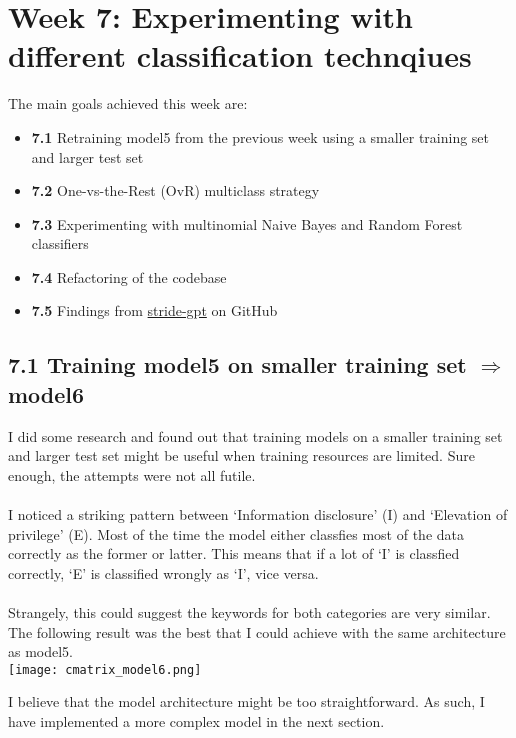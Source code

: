 \section*{Week 7: Experimenting with different classification technqiues}

The main goals achieved this week are:
\begin{itemize}[topsep=0pt]
    \item \textbf{7.1} Retraining model5 from the previous week using a smaller training set and larger test set
    \item \textbf{7.2} One-vs-the-Rest (OvR) multiclass strategy
    \item \textbf{7.3} Experimenting with multinomial Naive Bayes and Random Forest classifiers
    \item \textbf{7.4} Refactoring of the codebase
    \item \textbf{7.5} Findings from \href{https://github.com/mrwadams/stride-gpt?tab=readme-ov-file#usage}{stride-gpt} on GitHub
\end{itemize}

\subsection*{7.1 Training model5 on smaller training set $\Longrightarrow$ model6}
I did some research and found out that training models on a smaller training set and larger test set might be useful when training resources are limited.
Sure enough, the attempts were not all futile. \\\\
I noticed a striking pattern between `Information disclosure' (I) and `Elevation of privilege' (E). Most of the time the model either classfies most of the data correctly as the former or latter. This means that if a lot of `I' is classfied correctly, `E' is classified wrongly as `I', vice versa. \\\\
Strangely, this could suggest the keywords for both categories are very similar. The following result was the best that I could achieve with the same architecture as model5. \\

\texttt{[image: cmatrix\_model6.png]}

I believe that the model architecture might be too straightforward. As such, I have implemented a more complex model in the next section.

